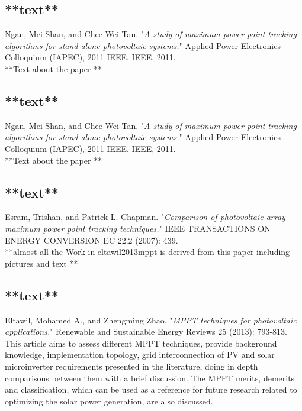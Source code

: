 {\ifx

\subsection{**text**\cite{ngan2011study}}

Ngan, Mei Shan, and Chee Wei Tan. "\textit{A study of maximum power point tracking algorithms for stand-alone photovoltaic systems.}" Applied Power Electronics Colloquium (IAPEC), 2011 IEEE. IEEE, 2011. \\

**Text about the paper **

\subsection{**text**\cite{ngan2011study}}

Ngan, Mei Shan, and Chee Wei Tan. "\textit{A study of maximum power point tracking algorithms for stand-alone photovoltaic systems.}" Applied Power Electronics Colloquium (IAPEC), 2011 IEEE. IEEE, 2011. \\

**Text about the paper **

\subsection{**text**\cite{esram2007comparison}}

Esram, Trishan, and Patrick L. Chapman. "\textit{Comparison of photovoltaic array maximum power point tracking techniques.}" IEEE TRANSACTIONS ON ENERGY CONVERSION EC 22.2 (2007): 439.\\

**almost all the Work in eltawil2013mppt is derived from this paper including pictures and text **
\fi


\subsection{**text**\cite{eltawil2013mppt}}

Eltawil, Mohamed A., and Zhengming Zhao. "\textit{MPPT techniques for photovoltaic applications.}" Renewable and Sustainable Energy Reviews 25 (2013): 793-813. \\

This article aims to assess different MPPT techniques, provide background knowledge, implementation topology, grid interconnection of PV and solar microinverter requirements presented in the literature, doing in depth comparisons between them with a brief discussion. The MPPT merits, demerits and classification, which can be used as a reference for future research related to optimizing the solar power generation, are also discussed.\\

}
